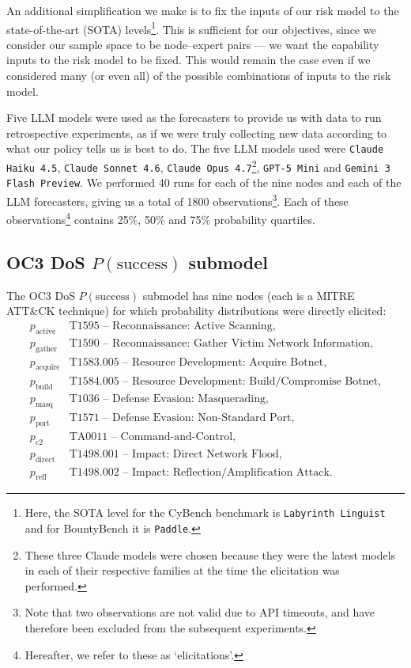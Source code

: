 \documentclass[11pt]{article}
\newcommand{\psuccess}{P(\text{success})}
\begin{document}
An additional simplification we make is to fix the inputs of our risk model to the state-of-the-art (SOTA) levels\footnote{Here, the SOTA level for the CyBench benchmark is \texttt{Labyrinth Linguist} and for BountyBench it is \texttt{Paddle}.}. This is sufficient for our objectives, since we consider our sample space to be node--expert pairs --- we want the capability inputs to the risk model to be fixed. This would remain the case even if we considered many (or even all) of the possible combinations of inputs to the risk model.

Five LLM models were used as the forecasters to provide us with data to run retrospective experiments, as if we were truly collecting new data according to what our policy tells us is best to do. The five LLM models used were \texttt{Claude Haiku 4.5}, \texttt{Claude Sonnet 4.6}, \texttt{Claude Opus 4.7}\footnote{These three Claude models were chosen because they were the latest models in each of their respective families at the time the elicitation was performed.}, \texttt{GPT-5 Mini} and \texttt{Gemini 3 Flash Preview}. We performed 40 runs for each of the nine nodes and each of the LLM forecasters, giving us a total of 1800 observations\footnote{Note that two observations are not valid due to API timeouts, and have therefore been excluded from the subsequent experiments.}. Each of these observations\footnote{Hereafter, we refer to these as `elicitations'.} contains 25\%, 50\% and 75\% probability quartiles.

\subsection{OC3 DoS \texorpdfstring{$P(\mathrm{success})$}{P(success)} submodel}

The OC3 DoS $\psuccess$ submodel has nine nodes (each is a MITRE ATT\&CK technique) for which probability distributions were directly elicited:
\[
\begin{array}{ll}
p_{\mathrm{active}} & \text{T1595 -- Reconnaissance: Active Scanning},\\
p_{\mathrm{gather}} & \text{T1590 -- Reconnaissance: Gather Victim Network Information},\\
p_{\mathrm{acquire}} & \text{T1583.005 -- Resource Development: Acquire Botnet},\\
p_{\mathrm{build}} & \text{T1584.005 -- Resource Development: Build/Compromise Botnet},\\
p_{\mathrm{masq}} & \text{T1036 -- Defense Evasion: Masquerading},\\
p_{\mathrm{port}} & \text{T1571 -- Defense Evasion: Non-Standard Port},\\
p_{\mathrm{c2}} & \text{TA0011 -- Command-and-Control},\\
p_{\mathrm{direct}} & \text{T1498.001 -- Impact: Direct Network Flood},\\
p_{\mathrm{refl}} & \text{T1498.002 -- Impact: Reflection/Amplification Attack}.
\end{array}
\]
\end{document}
